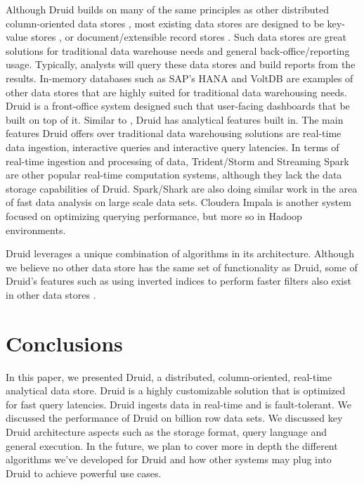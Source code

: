 \documentclass{vldb}
\begin{document}
Although Druid builds on many of the same principles as other
distributed column-oriented data stores \cite{fink2012distributed}, most existing data
stores are designed to be key-value stores \cite{lerner2010redis}, or
document/extensible record stores \cite{stonebraker2005c}. Such data stores are great
solutions for traditional data warehouse needs and general
back-office/reporting usage. Typically, analysts will query these data
stores and build reports from the results. In-memory databases such as
SAP’s HANA \cite{farber2012sap} and VoltDB \cite{voltdb2010voltdb} are examples of other data stores that
are highly suited for traditional data warehousing needs. Druid is a
front-office system designed such that user-facing dashboards that be
built on top of it. Similar to \cite{paraccel2013}, Druid has analytical features
built in. The main features Druid offers over traditional data
warehousing solutions are real-time data ingestion, interactive
queries and interactive query latencies. In terms of real-time
ingestion and processing of data, Trident/Storm \cite{marz2013storm} and Streaming
Spark \cite{zaharia2012discretized} are other popular real-time computation systems, although
they lack the data storage capabilities of Druid. Spark/Shark \cite{engle2012shark} are
also doing similar work in the area of fast data analysis on large
scale data sets. Cloudera Impala \cite{cloudera2013} is another system focused on
optimizing querying performance, but more so in Hadoop environments.

Druid leverages a unique combination of algorithms in its
architecture. Although we believe no other data store has the same set
of functionality as Druid, some of Druid’s features such as using
inverted indices to perform faster filters also exist in other data
stores \cite{macnicol2004sybase}.

\section{Conclusions}
\label{sec:conclusions}
In this paper, we presented Druid, a distributed, column-oriented,
real-time analytical data store. Druid is a highly customizable
solution that is optimized for fast query latencies. Druid ingests
data in real-time and is fault-tolerant. We discussed the performance
of Druid on billion row data sets. We discussed key Druid architecture
aspects such as the storage format, query language and general
execution. In the future, we plan to cover more in depth the different
algorithms we’ve developed for Druid and how other systems may plug
into Druid to achieve powerful use cases.
\end{document}
